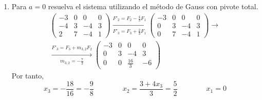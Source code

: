 \documentclass[12pt]{article}
\begin{document}
\begin{ejercicio}
\begin{enumerate}
        \item Para $a = 0$ resuelva el sistema utilizando el método de Gauss con pivote total.
        \begin{multline*}
            \left( \begin{array}{ccc|c}
                -3 & 0 & 0 & 0 \\
                -4 & 3 & -4 & 3\\
                2 & 7 & -4 & 1
            \end{array} \right)
            \xrightarrow[F'_3=F_3 +\frac{2}{3}F_1]{F'_2=F_2 -\frac{4}{3}F_1}
            \left( \begin{array}{ccc|c}
                -3 & 0 & 0 & 0\\
                0 & 3 & -4 & 3\\
                0 & 7 & -4 & 1
            \end{array} \right)
            \longrightarrow \\
            \xrightarrow[m_{3,2}=-\frac{7}{3}]{F'_3=F_3 +m_{3,2}F_2}
            \left( \begin{array}{ccc|c}
                -3 & 0 & 0 & 0\\
                0 & 3 & -4 & 3\\
                0 & 0 & \frac{16}{3} & -6
            \end{array} \right)
        \end{multline*}
        Por tanto,
        \begin{equation*}
            x_3 = -\frac{18}{16} = -\frac{9}{8}
            \qquad \qquad
            x_2 = \frac{3+4x_3}{3} = \frac{5}{2}
            \qquad \qquad
            x_1 = 0
        \end{equation*}
    \end{enumerate}
\end{ejercicio}
\end{document}
